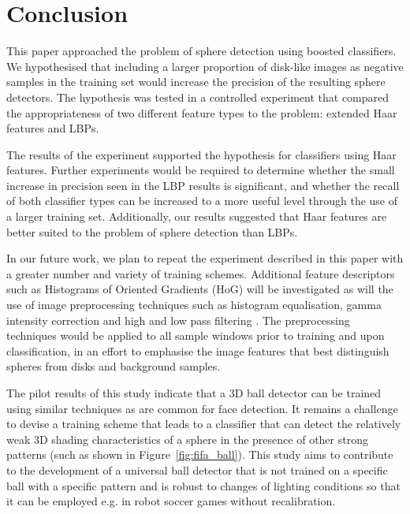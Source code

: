 \documentclass{sig-alternate-05-2015}
\newcommand{\tmpcomment}[1]{}
\newcommand{\citep}[1]{\cite{#1}}
\begin{document}
	\section{Conclusion} {
	\label{sec:conclusion}


		This paper approached the problem of sphere detection using boosted classifiers.
		We hypothesised that including a larger proportion of disk-like images as negative samples in the training set would increase the precision of the resulting sphere detectors.
		The hypothesis was tested in a controlled experiment that compared the appropriateness of two different feature types to the problem: extended Haar features\tmpcomment{, HoGs,} and LBPs.


    The results of the experiment supported the hypothesis for classifiers using Haar features. Further experiments would be required to determine whether the small increase in precision seen in the LBP results is significant, and whether the recall of both classifier types can be increased to a more useful level through the use of a larger training set.
    Additionally, our results suggested that Haar features are better suited to the problem of sphere detection than LBPs.

		In our future work, we plan to repeat the experiment described in this paper with a greater number and variety of training schemes.
    Additional feature descriptors such as Histograms of Oriented Gradients (HoG) will be investigated as will the use of image preprocessing techniques such as histogram equalisation, gamma intensity correction and high and low pass filtering \citep{gross2003image}.
    The preprocessing techniques would be applied to all sample windows prior to training and upon classification, in an effort to emphasise the image features that best distinguish spheres from disks and background samples.

    The pilot results of this study indicate that a 3D ball detector can be trained using similar techniques as are common for face detection. It remains a challenge to devise a training scheme that leads to a classifier that can detect the relatively weak 3D shading characteristics of a sphere in the presence of other strong patterns (such as shown in Figure~\ref{fig:fifa_ball}). This study aims to contribute to the development of a universal ball detector that is not trained on a specific ball with a specific pattern and is robust to changes of lighting conditions so that it can be employed e.g. in robot soccer games without recalibration.
	}
\end{document}
